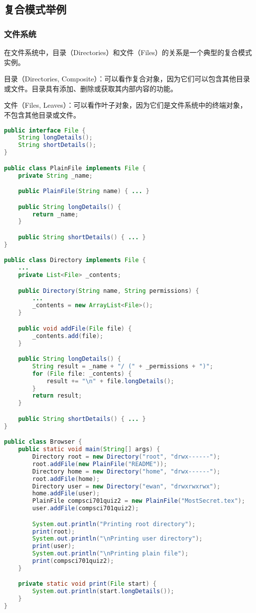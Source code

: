 \subsection{复合模式举例}

\subsubsection{文件系统}
在文件系统中，目录（Directories）和文件（Files）的关系是一个典型的复合模式实例。

目录（Directories, Composite）：可以看作复合对象，因为它们可以包含其他目录或文件。目录具有添加、删除或获取其内部内容的功能。

文件（Files, Leaves）：可以看作叶子对象，因为它们是文件系统中的终端对象，不包含其他目录或文件。

\begin{lstlisting}[language=Java, caption=Composite Design Pattern Example, label=lst:composite_pattern]
public interface File {
    String longDetails();
    String shortDetails();
}

public class PlainFile implements File {
    private String _name;

    public PlainFile(String name) { ... }

    public String longDetails() {
        return _name;
    }

    public String shortDetails() { ... }
}

public class Directory implements File {
    ...
    private List<File> _contents;

    public Directory(String name, String permissions) {
        ...
        _contents = new ArrayList<File>();
    }

    public void addFile(File file) {
        _contents.add(file);
    }

    public String longDetails() {
        String result = _name + "/ (" + _permissions + ")";
        for (File file: _contents) {
            result += "\n" + file.longDetails();
        }
        return result;
    }

    public String shortDetails() { ... }
}

public class Browser {
    public static void main(String[] args) {
        Directory root = new Directory("root", "drwx------");
        root.addFile(new PlainFile("README"));
        Directory home = new Directory("home", "drwx------");
        root.addFile(home);
        Directory user = new Directory("ewan", "drwxrwxrwx");
        home.addFile(user);
        PlainFile compsci701quiz2 = new PlainFile("MostSecret.tex");
        user.addFile(compsci701quiz2);

        System.out.println("Printing root directory");
        print(root);
        System.out.println("\nPrinting user directory");
        print(user);
        System.out.println("\nPrinting plain file");
        print(compsci701quiz2);
    }

    private static void print(File start) {
        System.out.println(start.longDetails());
    }
}
\end{lstlisting}

